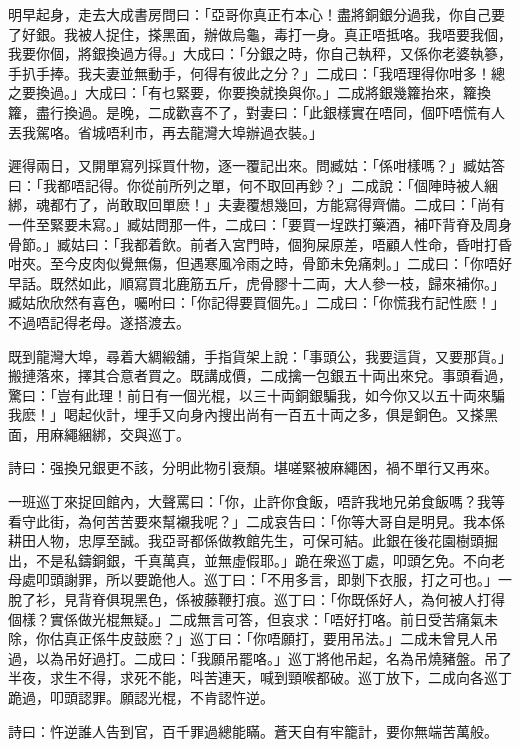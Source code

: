 \documentclass[a5paper, 12pt, openany]{book} %
\begin{document}
	明早起身，走去大成書房問曰：「亞哥你真正冇本心！盡將銅銀分過我，你自己要了好銀。我被人捉住，搽黑面，辦做烏龜，毒打一身。真正唔抵咯。我唔要我個，我要你個，將銀換過方得。」大成曰：「分銀之時，你自己執秤，又係你老婆執篸，手扒手捧。我夫妻並無動手，何得有彼此之分？」二成曰：「我唔理得你咁多！總之要換過。」大成曰：「有乜緊要，你要換就換與你。」二成將銀幾籮抬來，籮換籮，盡行換過。是晚，二成歡喜不了，對妻曰：「此銀樣實在唔同，個吓唔慌有人丟我駕咯。省城唔利市，再去龍灣大埠辦過衣裝。」

	遲得兩日，又開單寫列採買什物，逐一覆記出來。問臧姑：「係咁樣嗎？」臧姑答曰：「我都唔記得。你從前所列之單，何不取回再鈔？」二成說：「個陣時被人綑綁，魂都冇了，尚敢取回單麽！」夫妻覆想幾回，方能寫得齊備。二成曰：「尚有一件至緊要未寫。」臧姑問那一件，二成曰：「要買一埕跌打藥酒，補吓背脊及周身骨節。」臧姑曰：「我都着飲。前者入宮門時，個狗屎原差，唔顧人性命，昏咁打昏咁夾。至今皮肉似覺無傷，但遇寒風冷雨之時，骨節未免痛刺。」二成曰：「你唔好早話。既然如此，順寫買北鹿筋五斤，虎骨膠十二両，大人參一枝，歸來補你。」臧姑欣欣然有喜色，囑咐曰：「你記得要買個先。」二成曰：「你慌我冇記性麽！」不過唔記得老母。遂搭渡去。

	既到龍灣大埠，尋着大綢緞舖，手指貨架上說：「事頭公，我要這貨，又要那貨。」搬摙落來，擇其合意者買之。既講成價，二成擒一包銀五十両出來兌。事頭看過，驚曰：「豈有此理！前日有一個光棍，以三十両銅銀騙我，如今你又以五十両來騙我麽！」喝起伙計，埋手又向身內搜出尚有一百五十両之多，俱是銅色。又搽黑面，用麻繩綑綁，交與巡丁。

	詩曰：强換兄銀更不該，分明此物引衰頹。堪嗟緊被麻繩困，禍不單行又再來。

	一班巡丁來捉回館內，大聲罵曰：「你，止許你食飯，唔許我地兄弟食飯嗎？我等看守此街，為何苦苦要來幫襯我呢？」二成哀告曰：「你等大哥自是明見。我本係耕田人物，忠厚至誠。我亞哥都係做教館先生，可保可結。此銀在後花園樹頭掘出，不是私鑄銅銀，千真萬真，並無虛假耶。」跪在衆巡丁處，叩頭乞免。不向老母處叩頭謝罪，所以要跪他人。巡丁曰：「不用多言，即剝下衣服，打之可也。」一脫了衫，見背脊俱現黑色，係被藤鞭打痕。巡丁曰：「你既係好人，為何被人打得個樣？實係做光棍無疑。」二成無言可答，但哀求：「唔好打咯。前日受苦痛氣未除，你估真正係牛皮鼓麽？」巡丁曰：「你唔願打，要用吊法。」二成未曾見人吊過，以為吊好過打。二成曰：「我願吊罷咯。」巡丁將他吊起，名為吊燒豬盤。吊了半夜，求生不得，求死不能，呌苦連天，喊到頸喉都破。巡丁放下，二成向各巡丁跪過，叩頭認罪。願認光棍，不肯認忤逆。

	詩曰：忤逆誰人告到官，百千罪過總能瞞。蒼天自有牢籠計，要你無端苦萬般。
\end{document}
